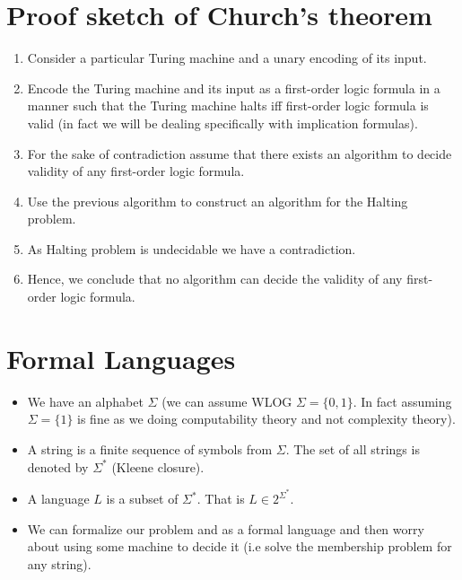\documentclass[
11pt,notheorems,hyperref={pdfauthor=whatever}
]{beamer}
\begin{document}
\section{Proof sketch of Church's theorem}
\begin{frame}
    \begin{enumerate}
        \setlength\itemsep{1em}
        \item Consider a particular Turing machine and a unary encoding of its input.
        \item Encode the Turing machine and its input as a first-order logic formula in a manner such that the Turing machine halts iff first-order logic formula is valid (in fact we will be dealing specifically with implication formulas).
        \item For the sake of contradiction assume that there exists an algorithm to decide validity of any first-order logic formula.
        \item Use the previous algorithm to construct an algorithm for the Halting problem.
        \item As Halting problem is undecidable we have a contradiction.
        \item Hence, we conclude that no algorithm can decide the validity of any first-order logic formula.
    \end{enumerate}
\end{frame}


\section{Formal Languages}
\begin{frame}
\begin{itemize}
    \setlength\itemsep{2em}
    \item We have an alphabet $\Sigma$ (we can assume WLOG $\Sigma = \{0, 1\}$. In fact assuming $\Sigma = \{1\}$ is fine as we doing computability theory and not complexity theory).
    \item A string is a finite sequence of symbols from $\Sigma$. The set of all strings is denoted by $\Sigma^*$ (Kleene closure).
    \item A language $L$ is a subset of $\Sigma^*$. That is $L \in 2^{\Sigma^*}$.
    \item We can formalize our problem and as a formal language and then worry about using some machine to decide it (i.e solve the membership problem for any string).
\end{itemize}
\end{frame}
\end{document}
